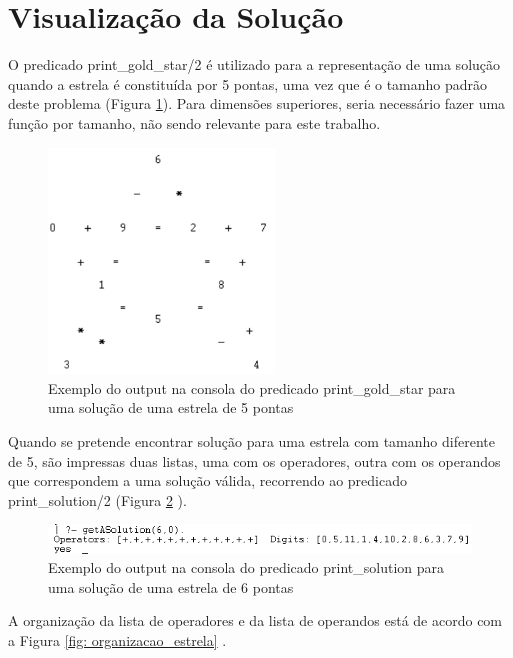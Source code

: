 \section{Visualização da Solução}

O predicado print\_gold\_star/2 é utilizado para a representação de uma solução quando a estrela é constituída por 5 pontas, uma vez que é o tamanho padrão deste problema (Figura \ref{fig: print_gold_star}). Para dimensões superiores, seria necessário fazer uma função por tamanho, não sendo relevante para este trabalho.

\begin{figure}[!htb]
\hfill\includegraphics[width=6cm,height=6cm]{images/print_gold_star.png}\hspace*{\fill}
\caption{Exemplo do output na consola do predicado print\_gold\_star para uma solução de uma estrela de 5 pontas} \label{fig: print_gold_star}
\end{figure} 

Quando se pretende encontrar solução para uma estrela com tamanho diferente de 5, são impressas duas listas, uma com os operadores, outra com os operandos que correspondem a uma solução válida, recorrendo ao predicado print\_solution/2 (Figura \ref{fig: print_solution} ).




\begin{figure}[!htb]
\includegraphics[width=\textwidth]{images/print_solution.png}
\caption{Exemplo do output na consola do predicado print\_solution para uma solução de uma estrela de 6 pontas} \label{fig: print_solution}
\end{figure}

A organização da lista de operadores e da lista de operandos está de acordo com a Figura \ref{fig: organizacao_estrela} .

